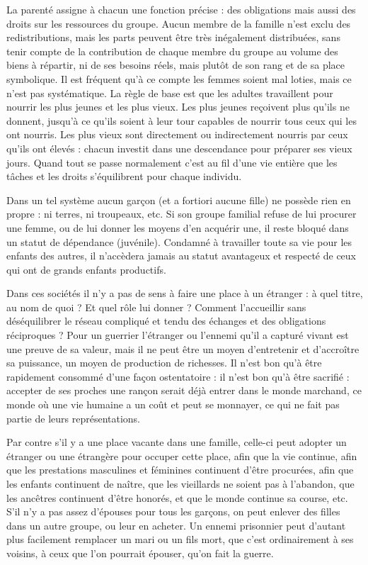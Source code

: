 La parenté assigne à chacun une fonction précise : des obligations 
mais aussi des droits sur les ressources du groupe. Aucun membre de la 
famille n'est exclu des redistributions, mais les parts peuvent être très 
inégalement distribuées, sans tenir compte de la contribution de chaque 
membre du groupe au volume des biens à répartir, ni de ses besoins
réels, mais plutôt de son rang et de sa place symbolique. Il est fréquent 
qu'à ce compte les femmes soient mal loties, mais ce n'est pas
systématique. La règle de base est que les adultes travaillent pour nourrir les plus 
jeunes et les plus vieux. Les plus jeunes reçoivent plus qu'ils ne donnent, 
jusqu'à ce qu'ils soient à leur tour capables de nourrir tous ceux qui les 
ont nourris. Les plus vieux sont directement ou indirectement nourris 
par ceux qu'ils ont élevés : chacun investit dans une descendance pour 
préparer ses vieux jours. Quand tout se passe normalement c'est au fil 
d'une vie entière que les tâches et les droits s'équilibrent pour chaque
individu.

Dans un tel système aucun garçon (et a fortiori aucune fille) ne 
possède rien en propre : ni terres, ni troupeaux, etc. Si son groupe familial refuse de 
lui procurer une femme, ou de lui donner les moyens d'en acquérir une, 
il reste bloqué dans un statut de dépendance (juvénile). Condamné à
travailler toute sa vie pour les enfants des autres, il n'accèdera jamais au
statut avantageux et respecté de ceux qui ont de grands enfants productifs.

Dans ces sociétés il n'y a pas de sens à faire une place à un
étranger : à quel titre, au nom de quoi ? Et quel rôle lui donner ? Comment 
l'accueillir sans déséquilibrer le réseau compliqué et tendu des échanges 
et des obligations réciproques ? Pour un guerrier l'étranger ou l'ennemi qu'il a
capturé vivant est une preuve de sa valeur, mais il ne peut être un moyen 
d'entretenir et d'accroître sa puissance, un moyen de production de
richesses. Il n'est bon qu'à être rapidement consommé d'une façon
ostentatoire : il n'est bon qu'à être sacrifié : accepter de ses proches une
rançon serait déjà entrer dans le monde marchand, ce monde où une vie humaine a un 
coût et peut se monnayer, ce qui ne fait pas partie de leurs représentations.

Par contre s'il y a une place vacante dans une famille, celle-ci peut 
adopter un étranger ou une étrangère pour occuper cette place, afin que 
la vie continue, afin que les prestations masculines et féminines
continuent d'être procurées, afin que les enfants continuent de naître, que les 
vieillards ne soient pas à l'abandon, que les ancêtres continuent d'être 
honorés, et que le monde continue sa course, etc. S'il n'y a pas assez 
d'épouses pour tous les garçons, on peut enlever des filles dans un autre 
groupe, ou leur en acheter. Un ennemi prisonnier peut d'autant plus 
facilement remplacer un mari ou un fils mort, que c'est ordinairement à ses 
voisins, à ceux que l'on pourrait épouser, qu'on fait la guerre.

